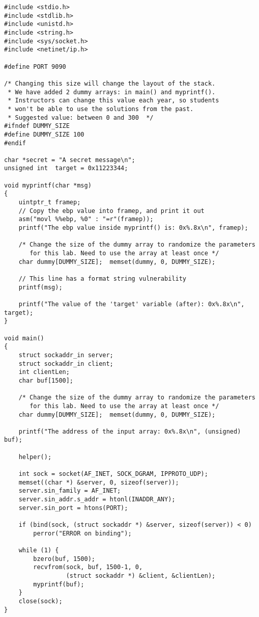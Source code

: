 \begin{lstlisting}[label=format:code:server, caption={The vulnerable server program
             \texttt{server.c} (can be downloaded from the lab's website)}]
#include <stdio.h>
#include <stdlib.h>
#include <unistd.h>
#include <string.h>
#include <sys/socket.h>
#include <netinet/ip.h>

#define PORT 9090

/* Changing this size will change the layout of the stack.
 * We have added 2 dummy arrays: in main() and myprintf().
 * Instructors can change this value each year, so students
 * won't be able to use the solutions from the past.
 * Suggested value: between 0 and 300  */
#ifndef DUMMY_SIZE
#define DUMMY_SIZE 100
#endif

char *secret = "A secret message\n";
unsigned int  target = 0x11223344;

void myprintf(char *msg)
{
    uintptr_t framep;
    // Copy the ebp value into framep, and print it out
    asm("movl %%ebp, %0" : "=r"(framep));
    printf("The ebp value inside myprintf() is: 0x%.8x\n", framep);

    /* Change the size of the dummy array to randomize the parameters
       for this lab. Need to use the array at least once */
    char dummy[DUMMY_SIZE];  memset(dummy, 0, DUMMY_SIZE);

    // This line has a format string vulnerability
    printf(msg);

    printf("The value of the 'target' variable (after): 0x%.8x\n", target);
}

void main()
{
    struct sockaddr_in server;
    struct sockaddr_in client;
    int clientLen;
    char buf[1500];

    /* Change the size of the dummy array to randomize the parameters
       for this lab. Need to use the array at least once */
    char dummy[DUMMY_SIZE];  memset(dummy, 0, DUMMY_SIZE);

    printf("The address of the input array: 0x%.8x\n", (unsigned) buf);

    helper();

    int sock = socket(AF_INET, SOCK_DGRAM, IPPROTO_UDP);
    memset((char *) &server, 0, sizeof(server));
    server.sin_family = AF_INET;
    server.sin_addr.s_addr = htonl(INADDR_ANY);
    server.sin_port = htons(PORT);

    if (bind(sock, (struct sockaddr *) &server, sizeof(server)) < 0)
        perror("ERROR on binding");

    while (1) {
        bzero(buf, 1500);
        recvfrom(sock, buf, 1500-1, 0,
                 (struct sockaddr *) &client, &clientLen);
        myprintf(buf);
    }
    close(sock);
}
\end{lstlisting}

